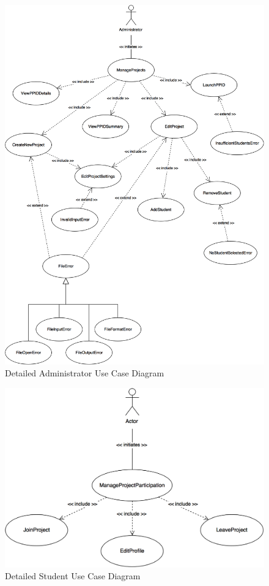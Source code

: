 \documentclass[12pt,letterpaper]{article}
\begin{document}
\begin{figure}[H]
	\centering{}
	\includegraphics[scale=0.23]{imgs/detailed-administrator-use-case-diagram.png}
	\caption{Detailed Administrator Use Case Diagram}
\end{figure}

\begin{figure}[H]
	\centering{}
	\includegraphics[scale=0.23]{imgs/detailed-student-use-case-diagram.png}
	\caption{Detailed Student Use Case Diagram}
\end{figure}
\end{document}
